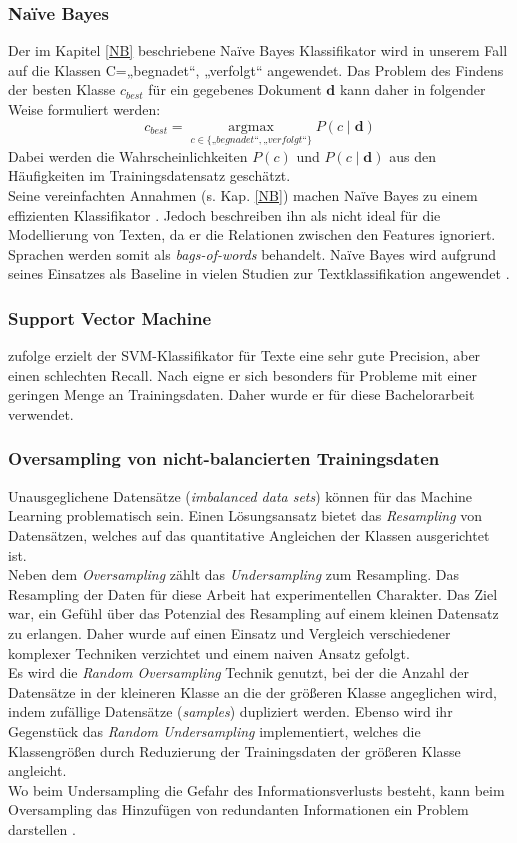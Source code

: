 \documentclass[ngerman]{ttlab-qualify}
\begin{document}
\subsubsection{Naïve Bayes}
Der im Kapitel \ref{NB} beschriebene Naïve Bayes Klassifikator wird in unserem Fall auf die Klassen C={„begnadet“, „verfolgt“} angewendet. Das Problem des Findens der besten Klasse \(c_{best}\) für ein gegebenes Dokument \(\mathbf{d}\) kann daher in folgender Weise formuliert werden: 
\[c_{best} = \operatorname*{argmax}_{c \in \{„begnadet“, „verfolgt“\}} P(c \mid \mathbf{d})\]
Dabei werden die Wahrscheinlichkeiten \(P(c)\) und  \(P(c \mid \mathbf{d})\) aus den Häufigkeiten im Trainingsdatensatz geschätzt.\\
Seine vereinfachten Annahmen (s. Kap. \ref{NB}) machen Naïve Bayes zu einem effizienten Klassifikator \parencite{Kowsari_2019}. Jedoch beschreiben \textcite{ikonomakis} ihn als nicht ideal für die Modellierung von Texten, da er die Relationen zwischen den Features ignoriert. Sprachen werden somit als \textit{bags-of-words} behandelt.
Naïve Bayes wird aufgrund seines Einsatzes als Baseline in vielen Studien zur Textklassifikation angewendet \parencite{ikonomakis}.
\subsubsection{Support Vector Machine}
\textcite{ikonomakis} zufolge erzielt der SVM-Klassifikator für Texte eine sehr gute Precision, aber einen schlechten Recall. Nach \textcite{manning2008introduction} eigne er sich besonders für Probleme mit einer geringen Menge an Trainingsdaten. Daher wurde er für diese Bachelorarbeit verwendet.
\subsubsection{Oversampling von nicht-balancierten Trainingsdaten}
Unausgeglichene Datensätze (\textit{imbalanced data sets}) können für das Machine Learning problematisch sein. Einen Lösungsansatz bietet das \textit{Resampling} von Datensätzen, welches auf das quantitative Angleichen der Klassen ausgerichtet ist.\\ Neben dem \textit{Oversampling} zählt das \textit{Undersampling} zum Resampling. 
Das Resampling der Daten für diese Arbeit hat experimentellen Charakter. Das Ziel war, ein Gefühl über das Potenzial des Resampling auf einem kleinen Datensatz zu erlangen. Daher wurde auf einen Einsatz und Vergleich verschiedener komplexer Techniken verzichtet und einem naiven Ansatz gefolgt.\\
Es wird die \textit{Random Oversampling} Technik genutzt, bei der die Anzahl der Datensätze in der kleineren Klasse an die der größeren Klasse angeglichen wird, indem zufällige Datensätze (\textit{samples}) dupliziert werden. Ebenso wird ihr Gegenstück das \textit{Random Undersampling} implementiert, welches die Klassengrößen durch Reduzierung der Trainingsdaten der größeren Klasse angleicht.\\
Wo beim Undersampling die Gefahr des Informationsverlusts besteht, kann beim Oversampling das Hinzufügen von redundanten Informationen ein Problem darstellen \parencite{Leevy_imbalance}.
\end{document}
